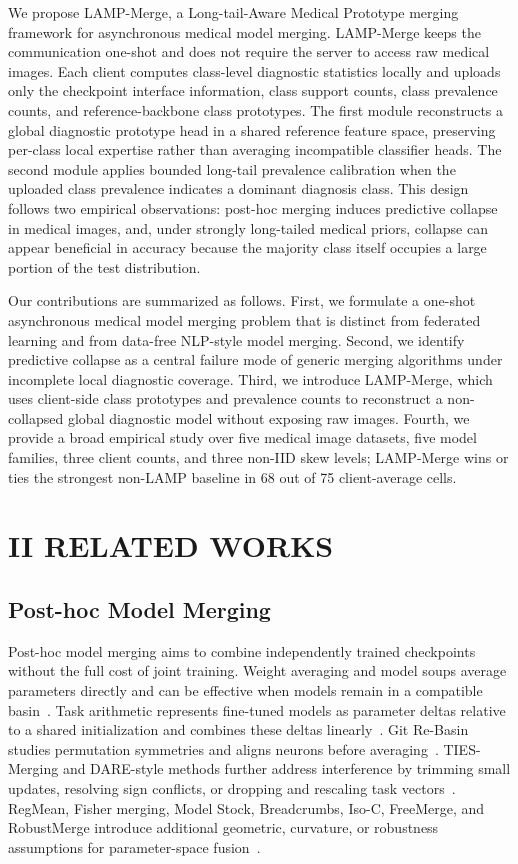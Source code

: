 We propose LAMP-Merge, a Long-tail-Aware Medical Prototype merging framework for asynchronous medical model merging. LAMP-Merge keeps the communication one-shot and does not require the server to access raw medical images. Each client computes class-level diagnostic statistics locally and uploads only the checkpoint interface information, class support counts, class prevalence counts, and reference-backbone class prototypes. The first module reconstructs a global diagnostic prototype head in a shared reference feature space, preserving per-class local expertise rather than averaging incompatible classifier heads. The second module applies bounded long-tail prevalence calibration when the uploaded class prevalence indicates a dominant diagnosis class. This design follows two empirical observations: post-hoc merging induces predictive collapse in medical images, and, under strongly long-tailed medical priors, collapse can appear beneficial in accuracy because the majority class itself occupies a large portion of the test distribution.

Our contributions are summarized as follows. First, we formulate a one-shot asynchronous medical model merging problem that is distinct from federated learning and from data-free NLP-style model merging. Second, we identify predictive collapse as a central failure mode of generic merging algorithms under incomplete local diagnostic coverage. Third, we introduce LAMP-Merge, which uses client-side class prototypes and prevalence counts to reconstruct a non-collapsed global diagnostic model without exposing raw images. Fourth, we provide a broad empirical study over five medical image datasets, five model families, three client counts, and three non-IID skew levels; LAMP-Merge wins or ties the strongest non-LAMP baseline in 68 out of 75 client-average cells.

\section{II RELATED WORKS}

\subsection{Post-hoc Model Merging}

Post-hoc model merging aims to combine independently trained checkpoints without the full cost of joint training. Weight averaging and model soups average parameters directly and can be effective when models remain in a compatible basin~\cite{wortsman2022model}. Task arithmetic represents fine-tuned models as parameter deltas relative to a shared initialization and combines these deltas linearly~\cite{ilharco2023task}. Git Re-Basin studies permutation symmetries and aligns neurons before averaging~\cite{ainsworth2023git}. TIES-Merging and DARE-style methods further address interference by trimming small updates, resolving sign conflicts, or dropping and rescaling task vectors~\cite{yadav2023ties,yu2024dare}. RegMean, Fisher merging, Model Stock, Breadcrumbs, Iso-C, FreeMerge, and RobustMerge introduce additional geometric, curvature, or robustness assumptions for parameter-space fusion~\cite{matena2022fisher,jin2023regmean}.

